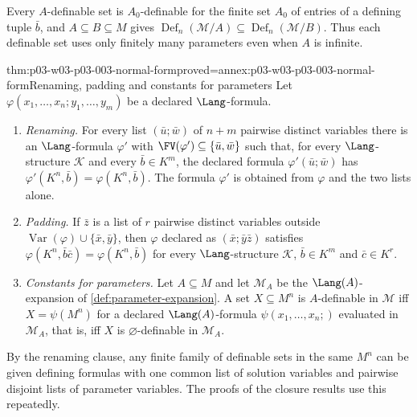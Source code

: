 Every \(A\)-definable set is \(A_0\)-definable for the finite set \(A_0\) of
entries of a defining tuple \(\bar b\), and \(A\subseteq B\subseteq M\)
gives \(\operatorname{Def}_n(\mathcal M/A)\subseteq
\operatorname{Def}_n(\mathcal M/B)\).  Thus each definable set uses only
finitely many parameters even when \(A\) is infinite.

\begin{hblemma}{thm:p03-w03-p03-003-normal-form}{proved=annex:p03-w03-p03-003-normal-form}{Renaming, padding and constants for parameters}
Let \(\varphi(x_1,\ldots,x_n;y_1,\ldots,y_m)\) be a declared
\(\Lang\)-formula.
\begin{enumerate}
 \item \emph{Renaming.}  For every list \((\bar u;\bar w)\) of \(n+m\)
       pairwise distinct variables there is an \(\Lang\)-formula \(\varphi'\)
       with \(\FV(\varphi')\subseteq\{\bar u,\bar w\}\) such that, for every
       \(\Lang\)-structure \(\mathcal K\) and every \(\bar b\in K^m\), the
       declared formula \(\varphi'(\bar u;\bar w)\) has
       \(\varphi'(K^n,\bar b)=\varphi(K^n,\bar b)\).  The formula
       \(\varphi'\) is obtained from \(\varphi\) and the two lists alone.
 \item \emph{Padding.}  If \(\bar z\) is a list of \(r\) pairwise distinct
       variables outside \(\operatorname{Var}(\varphi)\cup
       \{\bar x,\bar y\}\), then \(\varphi\) declared as
       \((\bar x;\bar y\bar z)\) satisfies
       \(\varphi(K^n,\bar b\bar c)=\varphi(K^n,\bar b)\) for every
       \(\Lang\)-structure \(\mathcal K\), \(\bar b\in K^m\) and
       \(\bar c\in K^r\).
 \item \emph{Constants for parameters.}  Let \(A\subseteq M\) and let
       \(\mathcal M_A\) be the \(\Lang(A)\)-expansion of
       \cref{def:parameter-expansion}.  A set \(X\subseteq M^n\) is
       \(A\)-definable in \(\mathcal M\) iff \(X=\psi(M^n)\) for a declared
       \(\Lang(A)\)-formula \(\psi(x_1,\ldots,x_n;)\) evaluated in
       \(\mathcal M_A\), that is, iff \(X\) is \(\varnothing\)-definable in
       \(\mathcal M_A\).
\end{enumerate}
\end{hblemma}

By the renaming clause, any finite family of definable sets in the same
\(M^n\) can be given defining formulas with one common list of solution
variables and pairwise disjoint lists of parameter variables.  The proofs of
the closure results use this repeatedly.

